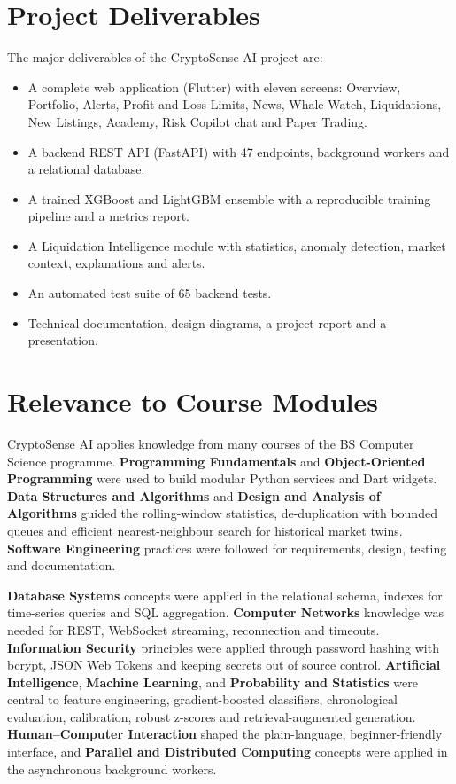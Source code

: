 \section{Project Deliverables}
The major deliverables of the CryptoSense AI project are:
\begin{itemize}
\item A complete web application (Flutter) with eleven screens: Overview, Portfolio, Alerts, Profit and Loss Limits, News, Whale Watch, Liquidations, New Listings, Academy, Risk Copilot chat and Paper Trading.
\item A backend REST API (FastAPI) with 47 endpoints, background workers and a relational database.
\item A trained XGBoost and LightGBM ensemble with a reproducible training pipeline and a metrics report.
\item A Liquidation Intelligence module with statistics, anomaly detection, market context, explanations and alerts.
\item An automated test suite of 65 backend tests.
\item Technical documentation, design diagrams, a project report and a presentation.
\end{itemize}

\section{Relevance to Course Modules}
CryptoSense AI applies knowledge from many courses of the BS Computer Science programme. \textbf{Programming Fundamentals} and \textbf{Object-Oriented Programming} were used to build modular Python services and Dart widgets. \textbf{Data Structures and Algorithms} and \textbf{Design and Analysis of Algorithms} guided the rolling-window statistics, de-duplication with bounded queues and efficient nearest-neighbour search for historical market twins. \textbf{Software Engineering} practices were followed for requirements, design, testing and documentation.

\textbf{Database Systems} concepts were applied in the relational schema, indexes for time-series queries and SQL aggregation. \textbf{Computer Networks} knowledge was needed for REST, WebSocket streaming, reconnection and timeouts. \textbf{Information Security} principles were applied through password hashing with bcrypt, JSON Web Tokens and keeping secrets out of source control. \textbf{Artificial Intelligence}, \textbf{Machine Learning}, and \textbf{Probability and Statistics} were central to feature engineering, gradient-boosted classifiers, chronological evaluation, calibration, robust z-scores and retrieval-augmented generation. \textbf{Human--Computer Interaction} shaped the plain-language, beginner-friendly interface, and \textbf{Parallel and Distributed Computing} concepts were applied in the asynchronous background workers.

